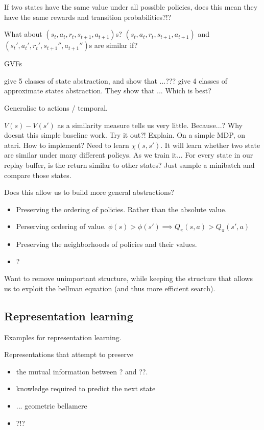 If two states have the same value under all possible policies, does this mean
they have the same rewards and transition probabilities?!?

What about $(s_t, a_t, r_t, s_{t+1}, a_{t+1})$s? $(s_t, a_t, r_t, s_{t+1}, a_{t+1})$ and $(s_t', a_t', r_t', s_{t+1}'', a_{t+1}'')$s are similar if?

GVFs

\cite{Littman2006} give 5 classes of state abstraction, and show that ...???
\cite{Abel2017} give 4 classes of approximate states abstraction. They show that ...
Which is best?

Generalise to actions / temporal.

$V(s) - V(s')$ as a similarity measure tells us very little. Because...?
Why doesnt this simple baseline work. Try it out?! Explain.
On a simple MDP, on atari. How to implement? Need to learn $\chi(s, s')$.
It will learn whether two state are similar under many different policys. As we train it...
For every state in our replay buffer, is the return similar to other states?
Just sample a minibatch and compare those states.

Does this allow us to build more general abstractions?

\begin{itemize}
\tightlist
  \item Preserving the ordering of policies. Rather than the absolute value.
  \item Perserving ordering of value. $\phi(s) > \phi(s') \implies Q_{\pi}(s, a) > Q_{\pi}(s', a)$
  \item Preserving the neighborhoods of policies and their values.
  \item ?
\end{itemize}

Want to remove unimportant structure, while keeping the structure that allows us
to exploit the bellman equation (and thus more efficient search).

\subsection{Representation learning}

Examples for representation learning.

Representations that attempt to preserve
\begin{itemize}
\tightlist
  \item the mutual information between ? and ??.
  \item knowledge required to predict the next state
  \item ... geometric bellamere
  \item ?!?
\end{itemize}


